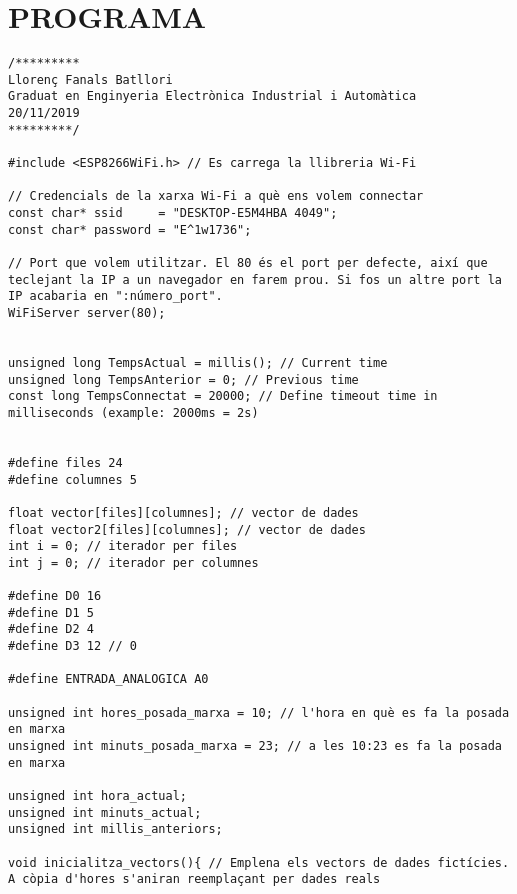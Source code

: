 \chapter{\uppercase{Programa}}
\begin{lstlisting}[style=myArduino]
/*********
Llorenç Fanals Batllori
Graduat en Enginyeria Electrònica Industrial i Automàtica
20/11/2019
*********/

#include <ESP8266WiFi.h> // Es carrega la llibreria Wi-Fi

// Credencials de la xarxa Wi-Fi a què ens volem connectar
const char* ssid     = "DESKTOP-E5M4HBA 4049";
const char* password = "E^1w1736";

// Port que volem utilitzar. El 80 és el port per defecte, així que teclejant la IP a un navegador en farem prou. Si fos un altre port la IP acabaria en ":número_port".
WiFiServer server(80);


unsigned long TempsActual = millis(); // Current time
unsigned long TempsAnterior = 0; // Previous time
const long TempsConnectat = 20000; // Define timeout time in milliseconds (example: 2000ms = 2s)


#define files 24
#define columnes 5

float vector[files][columnes]; // vector de dades
float vector2[files][columnes]; // vector de dades
int i = 0; // iterador per files
int j = 0; // iterador per columnes

#define D0 16
#define D1 5
#define D2 4
#define D3 12 // 0

#define ENTRADA_ANALOGICA A0

unsigned int hores_posada_marxa = 10; // l'hora en què es fa la posada en marxa
unsigned int minuts_posada_marxa = 23; // a les 10:23 es fa la posada en marxa

unsigned int hora_actual;
unsigned int minuts_actual;
unsigned int millis_anteriors;

void inicialitza_vectors(){ // Emplena els vectors de dades fictícies. A còpia d'hores s'aniran reemplaçant per dades reals
  

\end{lstlisting}
